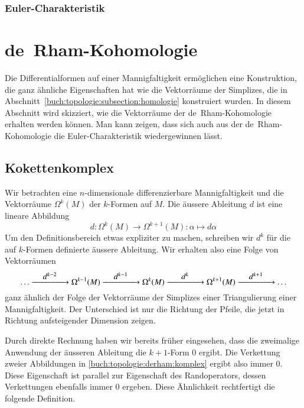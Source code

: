 \subsubsection{Euler-Charakteristik}


%
%
\section{de~Rham-Kohomologie}
Die Differentialformen auf einer Mannigfaltigkeit ermöglichen eine
Konstruktion, die ganz ähnliche Eigenschaften hat wie die Vektorräume
der Simplizes, die in Abschnitt~\ref{buch:topologie:subsection:homologie}
konstruiert wurden.
In diesem Abschnitt wird skizziert, wie die Vektorräume der
de~Rham-Kohomologie erhalten werden können.
Man kann zeigen, dass sich auch aus der de~Rham-Kohomologie die
Euler-Charakteristik wiedergewinnen lässt.

%
%
\subsection{Kokettenkomplex}
Wir betrachten eine $n$-dimensionale differenzierbare Mannigfaltigkeit
und die Vektorräume $\Omega^k(M)$ der $k$-Formen auf $M$.
Die äussere Ableitung $d$ ist eine lineare Abbildung
\[
d
\colon
\Omega^k(M) \to \Omega^{k+1}(M)
:
\alpha \mapsto d\alpha
\]
Um den Definitionsbereich etwas expliziter zu machen, schreiben wir
$d^k$ für die auf $k$-Formen definierte äussere Ableitung.
Wir erhalten also eine Folge von Vektorräumen 
\begin{equation}
\dots
\xrightarrow{\qquad\clap{$d^{k-2}$}\qquad}
\Omega^{k-1}(M)
\xrightarrow{\qquad\clap{$d^{k-1}$}\qquad}
\Omega^k(M)
\xrightarrow{\qquad\clap{$d^{k}$}\qquad}
\Omega^{k+1}(M)
\xrightarrow{\qquad\clap{$d^{k+1}$}\qquad}
\dots
\label{buch:topologie:derham:komplex}
\end{equation}
ganz ähnlich der Folge der Vektorräume der Simplizes einer
Triangulierung einer Mannigfaltigkeit.
Der Unterschied ist nur die Richtung der Pfeile, die jetzt in
Richtung aufsteigender Dimension zeigen.

Durch direkte Rechnung haben wir bereits früher eingesehen, dass die
zweimalige Anwendung der äusseren Ableitung die $k+1$-Form 0 ergibt.
Die Verkettung zweier Abbildungen in \eqref{buch:topologie:derham:komplex}
ergibt also immer $0$.
Diese Eigenschaft ist parallel zur Eigenschaft des Randoperators,
dessen Verkettungen ebenfalls immer $0$ ergeben.
Diese Ähnlichkeit rechtfertigt die folgende Definition.

